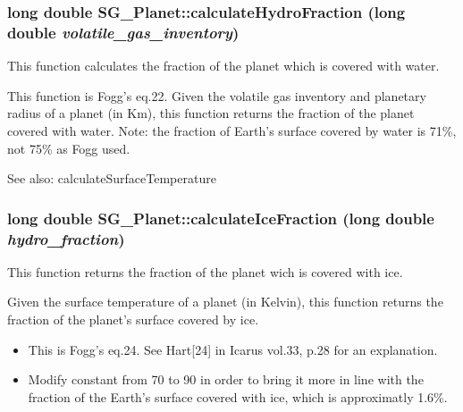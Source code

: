 \subsubsection{\setlength{\rightskip}{0pt plus 5cm}long double SG\_\-Planet::calculate\-Hydro\-Fraction (long double {\em volatile\_\-gas\_\-inventory})\hspace{0.3cm}{\tt  [protected]}}\label{class_s_g___planet_b18}


This function calculates the fraction of the planet which is covered with water. 

This function is Fogg's eq.22. Given the volatile gas inventory and planetary radius of a planet (in Km), this function returns the fraction of the planet covered with water. Note: the fraction of Earth's surface covered by water is 71\%, not 75\% as Fogg used. \begin{Desc}
\item[See also:]calculate\-Surface\-Temperature \end{Desc}
\subsubsection{\setlength{\rightskip}{0pt plus 5cm}long double SG\_\-Planet::calculate\-Ice\-Fraction (long double {\em hydro\_\-fraction})\hspace{0.3cm}{\tt  [protected]}}\label{class_s_g___planet_b19}


This function returns the fraction of the planet wich is covered with ice. 

Given the surface temperature of a planet (in Kelvin), this function returns the fraction of the planet's surface covered by ice.\begin{itemize}
\item This is Fogg's eq.24. See Hart[24] in Icarus vol.33, p.28 for an explanation.\item Modify constant from 70 to 90 in order to bring it more in line with the fraction of the Earth's surface covered with ice, which is approximatly 1.6\%. 
\end{itemize}
